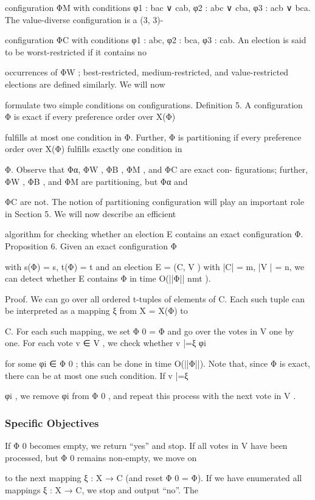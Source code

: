 \documentclass[12pt, a4paper]{report}
\begin{document}
configuration ΦM with conditions φ1 : bac ∨ cab, φ2 : abc ∨ cba, φ3 : acb ∨ bca. The value-diverse configuration is a (3, 3)-

configuration ΦC with conditions φ1 : abc, φ2 : bca, φ3 : cab. An election is said to be worst-restricted if it contains no 

occurrences of ΦW ; best-restricted, medium-restricted, and value-restricted elections are defined similarly. We will now 

formulate two simple conditions on configurations. Definition 5. A configuration Φ is exact if every preference order over X(Φ) 

fulfills at most one condition in Φ. Further, Φ is partitioning if every preference order over X(Φ) fulfills exactly one condition in 

Φ. Observe that Φα, ΦW , ΦB , ΦM , and ΦC are exact con- figurations; further, ΦW , ΦB , and ΦM are partitioning, but Φα and 

ΦC are not. The notion of partitioning configuration will play an important role in Section 5. We will now describe an efficient 

algorithm for checking whether an election E contains an exact configuration Φ. Proposition 6. Given an exact configuration Φ 

with s(Φ) = s, t(Φ) = t and an election E = (C, V ) with |C| = m, |V | = n, we can detect whether E contains Φ in time O(||Φ|| nmt ). 

Proof. We can go over all ordered t-tuples of elements of C. Each such tuple can be interpreted as a mapping ξ from X = X(Φ) to 

C. For each such mapping, we set Φ 0 = Φ and go over the votes in V one by one. For each vote v ∈ V , we check whether v |=ξ φi 

for some φi ∈ Φ 0 ; this can be done in time O(||Φ||). Note that, since Φ is exact, there can be at most one such condition. If v |=ξ 

φi , we remove φi from Φ 0 , and repeat this process with the next vote in V . 
\subsubsection*{Specific Objectives}
If Φ 0 becomes empty, we return “yes” and stop. If all votes in V have been processed, but Φ 0 remains non-empty, we move on 

to the next mapping ξ : X → C (and reset Φ 0 = Φ). If we have enumerated all mappings ξ : X → C, we stop and output “no”. The 
\end{document}
